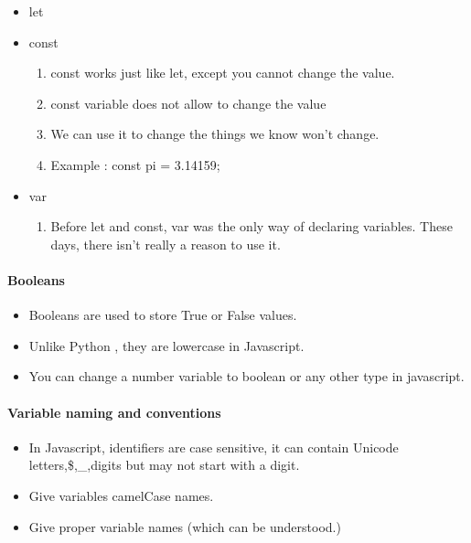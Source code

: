 \documentclass[
  paper=a4,
  ,captions=tableheading
]{scrartcl}
\providecommand{\tightlist}{%
  \setlength{\itemsep}{0pt}\setlength{\parskip}{0pt}}
\begin{document}
\begin{itemize}
\tightlist
\item
  let
\item
  const

  \begin{enumerate}
  \def\labelenumi{\arabic{enumi}.}
  \tightlist
  \item
    const works just like let, except you cannot change the value.
  \item
    const variable does not allow to change the value
  \item
    We can use it to change the things we know won't change.
  \item
    Example : const pi = 3.14159;
  \end{enumerate}
\item
  var

  \begin{enumerate}
  \def\labelenumi{\arabic{enumi}.}
  \tightlist
  \item
    Before let and const, var was the only way of declaring variables.
    These days, there isn't really a reason to use it.
  \end{enumerate}
\end{itemize}

\hypertarget{booleans}{%
\paragraph{Booleans}\label{booleans}}

\begin{itemize}
\tightlist
\item
  Booleans are used to store True or False values.
\item
  Unlike Python , they are lowercase in Javascript.
\item
  You can change a number variable to boolean or any other type in
  javascript.
\end{itemize}

\hypertarget{variable-naming-and-conventions}{%
\paragraph{Variable naming and
conventions}\label{variable-naming-and-conventions}}

\begin{itemize}
\tightlist
\item
  In Javascript, identifiers are case sensitive, it can contain Unicode
  letters,\$,\_,digits but may not start with a digit.
\item
  Give variables camelCase names.
\item
  Give proper variable names (which can be understood.)
\end{itemize}
\end{document}
